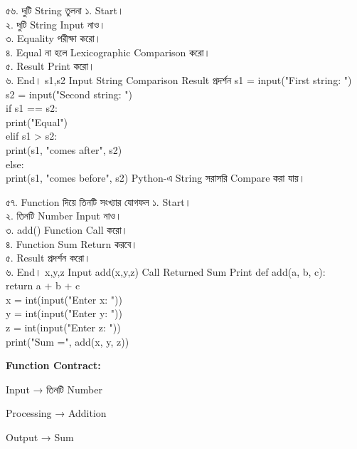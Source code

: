 
\exerciseTable
{৫৬. দুটি String তুলনা}
{
১. Start।\\
২. দুটি String Input নাও।\\
৩. Equality পরীক্ষা করো।\\
৪. Equal না হলে Lexicographic Comparison করো।\\
৫. Result Print করো।\\
৬. End।
}
{
\linearflow
{s1,s2 Input}
{String Comparison}
{Result প্রদর্শন}
}
{
s1 = input("First string: ")\\
s2 = input("Second string: ")\\
if s1 == s2:\\
\hspace*{4mm}print("Equal")\\
elif s1 > s2:\\
\hspace*{4mm}print(s1, "comes after", s2)\\
else:\\
\hspace*{4mm}print(s1, "comes before", s2)
}
{
Python-এ String সরাসরি Compare করা যায়।
}




\exerciseTable
{৫৭. Function দিয়ে তিনটি সংখ্যার যোগফল}
{
১. Start।\\
২. তিনটি Number Input নাও।\\
৩. \textenglish{\ttfamily add()} Function Call করো।\\
৪. Function Sum Return করবে।\\
৫. Result প্রদর্শন করো।\\
৬. End।
}
{
\linearflow
{x,y,z Input}
{add(x,y,z) Call}
{Returned Sum Print}
}
{
def add(a, b, c):\\
\hspace*{4mm}return a + b + c\\
x = int(input("Enter x: "))\\
y = int(input("Enter y: "))\\
z = int(input("Enter z: "))\\
print("Sum =", add(x, y, z))
}
{
\textbf{Function Contract:}

Input → তিনটি Number

Processing → Addition

Output → Sum
}

